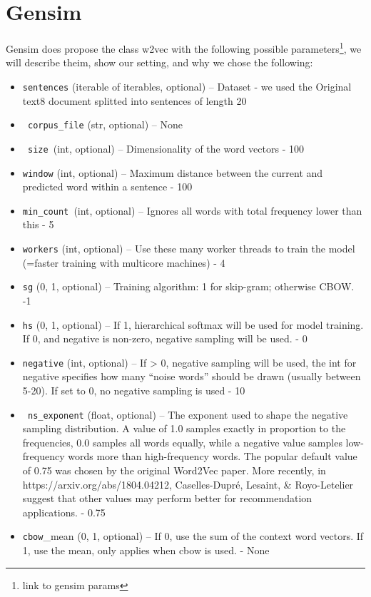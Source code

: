 \section{Gensim}
Gensim does propose the class w2vec with the following possible parameters\footnote{link to gensim params}, we will describe theim, show our setting, and why we chose the following: 
\begin{itemize}

   \item \texttt{sentences} (iterable of iterables, optional) – Dataset - we used the Original text8 document splitted into sentences of length 20
 \item  \texttt{ corpus\_file} (str, optional) – None
  \item \texttt{ size }(int, optional) – Dimensionality of the word vectors - 100
\item    \texttt{window} (int, optional) – Maximum distance between the current and predicted word within a sentence - 100
  \item  \texttt{min\_count }(int, optional) – Ignores all words with total frequency lower than this - 5
 \item   \texttt{workers} (int, optional) – Use these many worker threads to train the model (=faster training with multicore machines) - 4 
\item    \texttt{sg} ({0, 1}, optional) – Training algorithm: 1 for skip-gram; otherwise CBOW. -1
  \item  \texttt{hs} ({0, 1}, optional) – If 1, hierarchical softmax will be used for model training. If 0, and negative is non-zero, negative sampling will be used. - 0
  \item  \texttt{negative} (int, optional) – If > 0, negative sampling will be used, the int for negative specifies how many “noise words” should be drawn (usually between 5-20). If set to 0, no negative sampling is used - 10 
\item   \texttt{ ns\_exponent} (float, optional) – The exponent used to shape the negative sampling distribution. A value of 1.0 samples exactly in proportion to the frequencies, 0.0 samples all words equally, while a negative value samples low-frequency words more than high-frequency words. The popular default value of 0.75 was chosen by the original Word2Vec paper. More recently, in https://arxiv.org/abs/1804.04212, Caselles-Dupré, Lesaint, \& Royo-Letelier suggest that other values may perform better for recommendation applications. - 0.75
   \item \texttt{cbow}\_mean ({0, 1}, optional) – If 0, use the sum of the context word vectors. If 1, use the mean, only applies when cbow is used. - None

\end{itemize}
